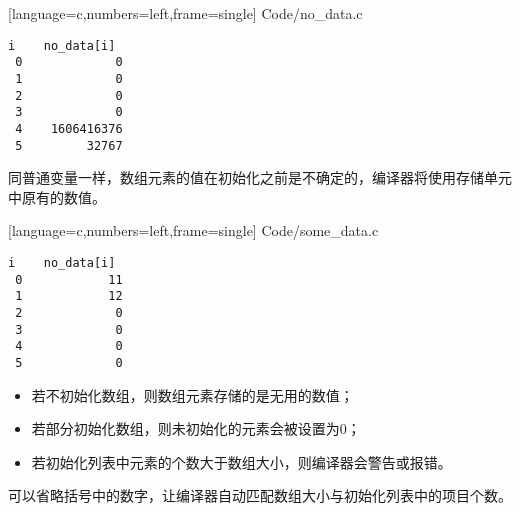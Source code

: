 \begin{frame}[fragile]

[language=c,numbers=left,frame=single]
{Code/no_data.c}
\end{frame}

\begin{frame}[fragile]
\begin{lstlisting}[backgroundcolor=\color{red!20}]
 i    no_data[i]
 0             0
 1             0
 2             0
 3             0
 4    1606416376
 5         32767
\end{lstlisting}
\end{frame}

\begin{frame}[fragile]
同普通变量一样，数组元素的值在初始化之前是不确定的，编译器将使用存储单元中原有的数值。
\end{frame}

\begin{frame}[fragile]

[language=c,numbers=left,frame=single]
{Code/some_data.c}
\end{frame}

\begin{frame}[fragile]
\begin{lstlisting}[backgroundcolor=\color{red!20}]
 i    no_data[i]
 0            11
 1            12
 2             0
 3             0
 4             0
 5             0
\end{lstlisting}
\end{frame}

\begin{frame}[fragile]
\begin{itemize}
\item
若不初始化数组，则数组元素存储的是无用的数值；\\[0.1in]
\item
若部分初始化数组，则未初始化的元素会被设置为0；\\[0.1in]
\item
若初始化列表中元素的个数大于数组大小，则编译器会警告或报错。
\end{itemize}
\end{frame}

\begin{frame}[fragile]
可以省略括号中的数字，让编译器自动匹配数组大小与初始化列表中的项目个数。
\end{frame}

